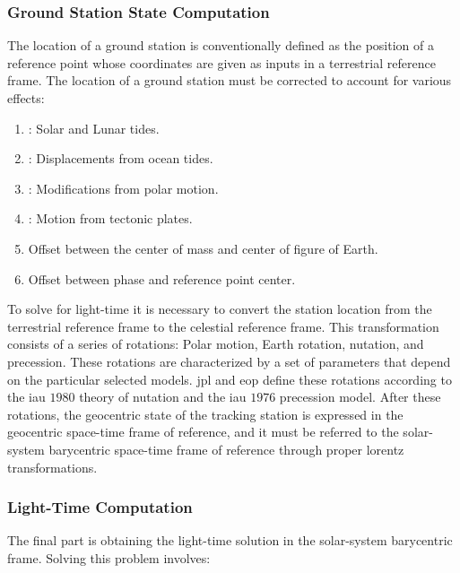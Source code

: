 \documentclass[oneside]{book}
\theoremstyle{mystyle}
\begin{document}
\subsubsection{\footnotesize Ground Station State Computation}

The location of a ground station is conventionally defined as the position of a reference point whose coordinates are given as inputs in a terrestrial reference frame. The location of a ground station must be corrected to account for various effects:

\begin{enumerate}[itemsep=0pt]
\item {}: Solar and Lunar tides.
\item {}: Displacements from ocean tides.
\item {}: Modifications from polar motion.
\item {}: Motion from tectonic plates.
\item Offset between the center of mass and center of figure of Earth.
\item Offset between phase and reference point center.
\end{enumerate}

\noindent To solve for light-time it is necessary to convert the station location from the terrestrial reference frame to the celestial reference frame. This transformation consists of a series of rotations: Polar motion, Earth rotation, \gls{nutation}, and \gls{precession}. These rotations are characterized by a set of parameters that depend on the particular selected models. \gls{jpl} and \gls{eop} define these rotations according to the \gls{iau} $1980$ theory of \gls{nutation} and the \gls{iau} $1976$ \gls{precession} model. After these rotations, the geocentric state of the tracking
station is expressed in the geocentric space-time frame of reference, and it must be referred to the solar-system barycentric space-time frame of reference through proper
\glspl{lorentz transformation}.

\subsubsection{\footnotesize Light-Time Computation}

The final part is obtaining the light-time solution in the solar-system barycentric frame. Solving this problem involves:
\end{document}
